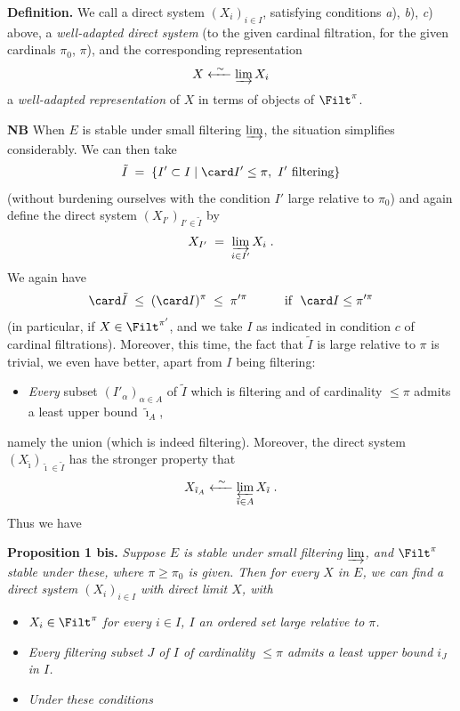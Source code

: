\textbf{Definition.} We call a direct system $(X_i)_{i\in I}$, satisfying conditions \textit{a}), \textit{b}), \textit{c}) above, a \textit{well-adapted direct system} (to the given cardinal filtration, for the given cardinals $\pi_0$, $\pi$), and the corresponding representation
\[
X \xleftarrow{\ \sim\ } \varinjlim X_i
\]
a \textit{well-adapted representation} of $X$ in terms of objects of $\Filt^\pi$.

\textbf{NB} When $E$ is stable under small filtering $\varinjlim$, the situation simplifies considerably. We can then take
\[
\tilde I \;=\; \{I'\subset I \mid \card I'\le\pi,\ I' \text{ filtering}\}
\]
(without burdening ourselves with the condition $I'$ large relative to $\pi_0$) and again define the direct system $(X_{I'})_{I'\in\tilde I}$ by
\[
X_{I'} \;=\; \varinjlim_{i\in I'} X_i \;.
\]
We again have
\[
\card\tilde I \;\le\; (\card I)^\pi \;\le\; \pi'^{\pi} \qquad\quad \text{if }\ \card I\le\pi'^{\pi}
\]
(in particular, if $X\in\Filt^{\pi'}$, and we take $I$ as indicated in condition $c$ of cardinal filtrations). Moreover, this time, the fact that $\tilde I$ is large relative to $\pi$ is trivial, we even have better, apart from $I$ being filtering:

\begin{itemize}
\item[$(*)$] \textit{Every} subset $(I'_\alpha)_{\alpha\in A}$ of $\tilde I$ which is filtering and of cardinality $\le\pi$ admits a least upper bound $\tilde\imath_A$,
\end{itemize}

namely the union (which is indeed filtering). Moreover, the direct system $(X_{\tilde\imath})_{\tilde\imath\in\tilde I}$ has the stronger property that
\[
X_{\tilde\imath_A} \xleftarrow{\ \sim\ } \varprojlim_{\tilde\imath\in A} X_{\tilde\imath} \;. %
\]
Thus we have

\textbf{Proposition 1 bis.} \textit{Suppose $E$ is stable under small filtering $\varinjlim$, and} $\Filt^\pi$ \textit{stable under these, where $\pi\ge\pi_0$ is given. Then for every $X$ in $E$, we can find a direct system $(X_i)_{i\in I}$ with direct limit $X$, with}

\begin{itemize}
\item[a)] $X_i\in\Filt^\pi$ \textit{for every $i\in I$, $I$ an ordered set large relative to $\pi$.}
\item[b)] \textit{Every filtering subset $J$ of $I$ of cardinality $\le\pi$ admits a least upper bound $i_J$ in $I$.}
\item[c)] \textit{Under these conditions}
\end{itemize}

